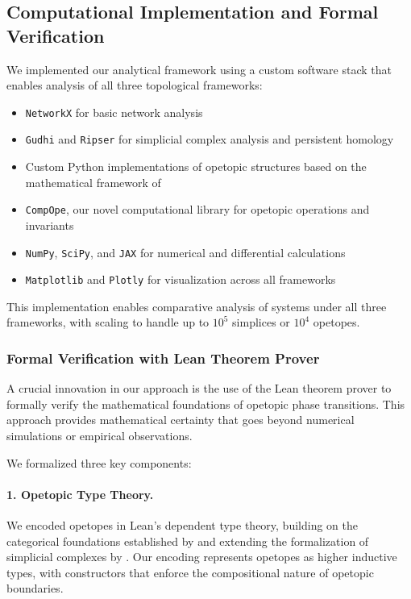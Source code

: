 \subsection{Computational Implementation and Formal Verification}
We implemented our analytical framework using a custom software stack that enables analysis of all three topological frameworks:

\begin{itemize}[leftmargin=*]
  \item \texttt{NetworkX} for basic network analysis
  \item \texttt{Gudhi} and \texttt{Ripser} for simplicial complex analysis and persistent homology
  \item Custom Python implementations of opetopic structures based on the mathematical framework of \citet{kock2010polynomial}
  \item \texttt{CompOpe}, our novel computational library for opetopic operations and invariants
  \item \texttt{NumPy}, \texttt{SciPy}, and \texttt{JAX} for numerical and differential calculations
  \item \texttt{Matplotlib} and \texttt{Plotly} for visualization across all frameworks
\end{itemize}

This implementation enables comparative analysis of systems under all three frameworks, with scaling to handle up to $10^5$ simplices or $10^4$ opetopes.

\subsubsection{Formal Verification with Lean Theorem Prover}
A crucial innovation in our approach is the use of the Lean theorem prover \citep{moura2015lean} to formally verify the mathematical foundations of opetopic phase transitions. This approach provides mathematical certainty that goes beyond numerical simulations or empirical observations.

We formalized three key components:

\paragraph{1. Opetopic Type Theory.} We encoded opetopes in Lean's dependent type theory, building on the categorical foundations established by \citet{finster2019type} and extending the formalization of simplicial complexes by \citet{han2022formalizing}. Our encoding represents opetopes as higher inductive types, with constructors that enforce the compositional nature of opetopic boundaries.

